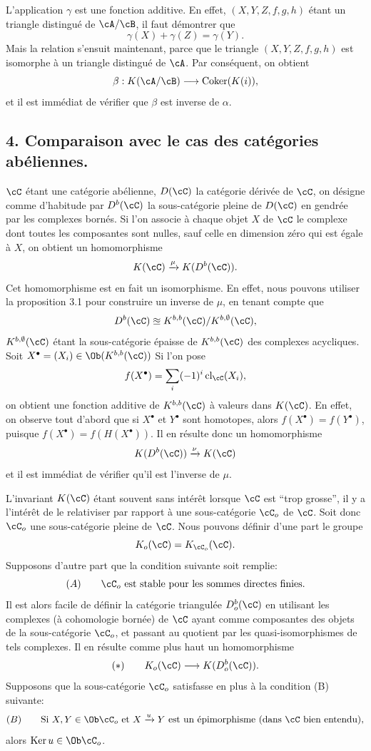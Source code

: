 L'application $\gamma$ est une fonction additive. En effet, $(X,Y,Z,f,g,h)$ étant un triangle distingué de $\cA/\cB$, il faut démontrer que
\[
\gamma(X)+\gamma(Z)=\gamma(Y).
\]
Mais la relation s'ensuit maintenant, parce que le triangle $(X,Y,Z,f,g,h)$ est isomorphe à un triangle distingué de $\cA$. Par conséquent, on obtient
\[
\beta:K(\cA/\cB)\longrightarrow \operatorname{Coker}(K(i)),
\]
et il est immédiat de vérifier que $\beta$ est inverse de $\alpha$.

\subsection*{4. Comparaison avec le cas des catégories abéliennes.}

$\cC$ étant une catégorie abélienne, $D(\cC)$ la catégorie dérivée de $\cC$, on désigne comme d'habitude par $D^b(\cC)$ la sous-catégorie pleine de $D(\cC)$ 
en%
gendrée par les
complexes bornés. Si l'on associe à chaque objet $X$ de $\cC$ le complexe dont toutes les composantes sont nulles, sauf celle en dimension zéro qui est égale à $X$, on obtient un homomorphisme
\[
K(\cC)\xrightarrow{\mu}K(D^b(\cC)).
\]
Cet homomorphisme est en fait un isomorphisme. En effet, nous pouvons utiliser la proposition 3.1 pour construire un inverse de $\mu$, en tenant compte que
\[
D^b(\cC)\approxeq K^{b,b}(\cC)/K^{b,\emptyset}(\cC),
\]
$K^{b,\emptyset}(\cC)$ étant la sous-catégorie épaisse de $K^{b,b}(\cC)$ des complexes acycliques. Soit $X^\bullet=(X_i)\in\Ob(K^{b,b}(\cC))$ Si l'on pose
\[
f(X^\bullet)=\sum_i(-1)^i\operatorname{cl}_{\cC}(X_i),
\]
on obtient une fonction additive de $K^{b,b}(\cC)$ à valeurs dans $K(\cC)$. En effet, on observe tout d'abord que si $X^\bullet$ et $Y^\bullet$ sont homotopes, alors $f(X^\bullet)=f(Y^\bullet)$, puisque $f(X^\bullet)=f(H(X^\bullet))$. Il en résulte donc un homomorphisme
\[
K(D^b(\cC))\xrightarrow{\nu}K(\cC)
\]
et il est immédiat de vérifier qu'il est l'inverse de $\mu$.

L'invariant $K(\cC)$ étant souvent sans intérêt lorsque $\cC$ est ``trop grosse'', il y a l'intérêt de le relativiser par rapport à une sous-catégorie $\cC_o$ de $\cC$. Soit donc $\cC_o$ une sous-catégorie pleine de $\cC$. Nous pouvons définir d'une part le groupe
\[
K_o(\cC)=K_{\cC_o}(\cC).
\]
Supposons d'autre part que la condition suivante soit remplie:
\[
(A)\qquad \cC_o\text{ est stable pour les sommes directes finies.}
\]
Il est alors facile de définir la catégorie triangulée $D_o^b(\cC)$ en utilisant les complexes (à cohomologie bornée) de $\cC$ ayant comme composantes des objets de la sous-catégorie $\cC_o$, et passant au
quotient par les quasi-isomorphismes de tels complexes. Il en résulte comme plus haut un homomorphisme
\[
(*)\qquad K_o(\cC)\longrightarrow K(D_o^b(\cC)).
\]
Supposons que la sous-catégorie $\cC_o$ satisfasse en plus à la condition (B) suivante:
\[
(B)\qquad
\text{Si }X,Y\in\Ob\cC_o\text{ et }X\xrightarrow{u}Y
\text{ est un épimorphisme (dans }\cC\text{ bien entendu)},
\]
alors $\operatorname{Ker}u\in\Ob\cC_o$.

